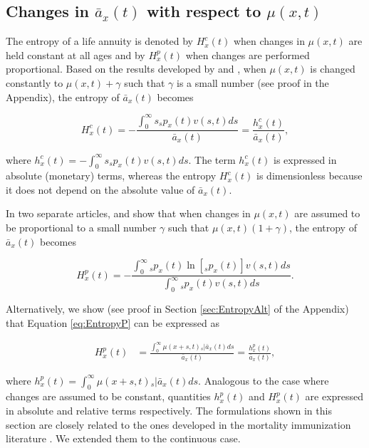 \documentclass[12pt]{article}
\begin{document}
\subsection{Changes in $\bar{a}_x(t)$ with respect to $\mu(x,t)$}

The entropy of a life annuity is denoted by ${H}^{c}_{x}(t)$ when changes in $\mu(x,t)$ are held constant at all ages and by ${H}^{p}_{x}(t)$ when  changes are performed proportional. Based on the results developed by \citet{Tsai2013a} and \citet{Lin2020}, when $\mu(x,t)$ is changed constantly to $\mu(x,t)+\gamma$ such that $\gamma$ is a small number (see proof in the Appendix), the entropy of $\bar{a}_x(t)$ becomes

\begin{equation}\label{eq:EntropyC}
{H}^{c}_{x}(t) = -\frac{\int_{0}^\infty s {}_sp_x(t) {v}(s,t) ds}{\bar{a}_x(t)}=\frac{{h}^{c}_{x}(t)}{\bar{a}_x(t)},
\end{equation}

where ${h}^{c}_{x}(t)=-\int_{0}^\infty s {}_sp_x(t) {v}(s,t) ds$. The term ${h}^{c}_{x}(t)$ is expressed in absolute (monetary) terms, whereas the entropy ${H}^{c}_{x}(t)$ is dimensionless because it does not depend on the absolute value of $\bar{a}_x(t)$.


In two separate articles, \citet{Haberman2011} and \citet{Tsai2013a} show that when changes in $\mu(x,t)$ are assumed to be proportional to a small number $\gamma$ such that $\mu(x,t)(1+\gamma)$, the entropy of $\bar{a}_x(t)$ becomes

\begin{equation} \label{eq:EntropyP}
{H}^{p}_{x}(t) = -\frac{ \int_{0}^{\infty}{}_sp_x(t)\ln[{}_sp_x(t)] {v}(s,t) ds}{\int_0^\infty {}_sp_x(t) {v}(s,t) ds}.
\end{equation}


Alternatively, we show (see proof in Section \ref{sec:EntropyAlt} of the Appendix) that Equation \ref{eq:EntropyP} can be expressed as

\begin{equation} \label{eq:EntropyP2}
\begin{split}
{H}^{p}_{x}(t) &=  \frac{\int_0^\infty \mu(x+s,t)   {}_s|\bar{a}_x(t) ds}{\bar{a}_x(t)} =  \frac{{h}^{p}_{x}(t)}{\bar{a}_x(t)}, 
\end{split}
\end{equation}

where ${h}^{p}_{x}(t)=\int_0^\infty \mu(x+s,t)   {}_s|\bar{a}_x(t) ds$. Analogous to the case where changes are assumed to be constant, quantities ${h}^{p}_{x}(t)$ and ${H}^{p}_{x}(t)$ are expressed in absolute and relative terms respectively. The formulations shown in this section are closely related to the ones developed in the mortality immunization literature \citep{Tsai2013a,Lin2020}. We extended them to the continuous case.
\end{document}
